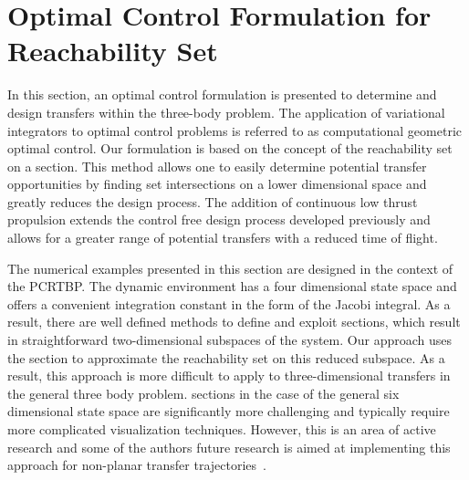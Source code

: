 \documentclass[smallcondensed]{svjour3}
\begin{document}
\section{Optimal Control Formulation for Reachability Set}\label{sec:optimal_control}
In this section, an optimal control formulation is presented to determine and design transfers within the three-body problem.
The application of variational integrators to optimal control problems is referred to as computational geometric optimal control.
Our formulation is based on the concept of the reachability set on a \Poincare section.
This method allows one to easily determine potential transfer opportunities by finding set intersections on a lower dimensional space and greatly reduces the design process.
The addition of continuous low thrust propulsion extends the control free design process developed previously and allows for a greater range of potential transfers with a reduced time of flight.

The numerical examples presented in this section are designed in the context of the PCRTBP.
The dynamic environment has a four dimensional state space and offers a convenient integration constant in the form of the Jacobi integral.
As a result, there are well defined methods to define and exploit \Poincare sections, which result in straightforward two-dimensional subspaces of the system.
Our approach uses the \Poincare section to approximate the reachability set on this reduced subspace.
As a result, this approach is more difficult to apply to three-dimensional transfers in the general three body problem.
\Poincare sections in the case of the general six dimensional state space are significantly more challenging and typically require more complicated visualization techniques. 
However, this is an area of active research and some of the authors future research is aimed at implementing this approach for non-planar transfer trajectories~\cite{kulumani2016d}.
\end{document}
